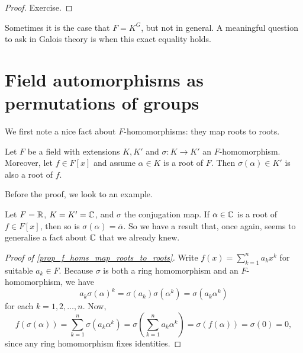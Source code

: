 \begin{proof}
    Exercise.
\end{proof}

\begin{remark}
    Sometimes it is the case that $F = K^G$, but not in general. A meaningful question to ask in Galois theory is when this exact equality holds.
\end{remark}

\section{Field automorphisms as permutations of groups}

We first note a nice fact about $F$-homomorphisms: they map roots to roots.

\begin{lemma}
\label{prop_f_homs_map_roots_to_roots}
    Let $F$ be a field with extensions $K, K'$ and $\sigma: K \to K'$ an $F$-homomorphism. Moreover, let $f \in F[x]$ and assume $\alpha \in K$ is a root of $F$. Then $\sigma(\alpha) \in K'$ is also a root of $f$.
\end{lemma}

Before the proof, we look to an example.

\begin{example}
    Let $F = \mathbb{{R}}$, $K = K' = \mathbb{{C}}$, and $\sigma$ the conjugation map. If $\alpha \in \mathbb{{C}}$ is a root of $f \in F[x]$, then so is $\sigma(\alpha) = \overline{\alpha}$. So we have a result that, once again, seems to generalise a fact about $\mathbb{{C}}$ that we already knew.
\end{example}

\begin{proof}[Proof of \cref{prop_f_homs_map_roots_to_roots}]
    Write $f(x) = \sum_{k = 1}^{n} a_k x^k$ for suitable $a_k \in F$. Because $\sigma$ is both a ring homomorphism and an $F$-homomorphism, we have
    \[
        a_k \sigma(\alpha)^k = \sigma(a_k) \sigma(\alpha^k) = \sigma(a_k \alpha^k)
    \]
    for each $k = 1, 2, \ldots, n$. Now,
    \[
        f(\sigma(\alpha))
        = \sum_{k = 1}^{n} \sigma(a_k \alpha^k)
        = \sigma\left(\sum_{k = 1}^{n} a_k \alpha^k\right)
        = \sigma(f(\alpha))
        = \sigma(0)
        = 0,
    \]
    since any ring homomorphism fixes identities.
\end{proof}

